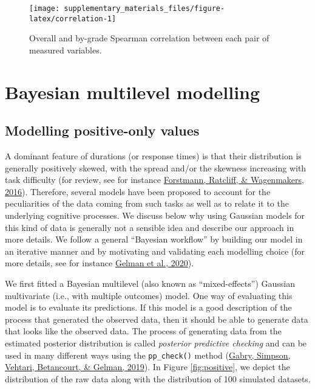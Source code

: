 \documentclass[
  11pt,
  english,
  ,doc,mask,floatsintext]{apa6}
\begin{document}
\begin{figure}[!htb]

{\centering \texttt{[image: supplementary\_materials\_files/figure-latex/correlation-1]} 

}

\caption{Overall and by-grade Spearman correlation between each pair of measured variables.}\label{fig:correlation}
\end{figure}

\newpage

\hypertarget{bayesian-multilevel-modelling}{%
\section{Bayesian multilevel modelling}\label{bayesian-multilevel-modelling}}

\hypertarget{modelling-positive-only-values}{%
\subsection{Modelling positive-only values}\label{modelling-positive-only-values}}

A dominant feature of durations (or response times) is that their distribution is generally positively skewed, with the spread and/or the skewness increasing with task difficulty (for review, see for instance \protect\hyperlink{ref-forstmann_sequential_2016}{Forstmann, Ratcliff, \& Wagenmakers, 2016}). Therefore, several models have been proposed to account for the peculiarities of the data coming from such tasks as well as to relate it to the underlying cognitive processes. We discuss below why using Gaussian models for this kind of data is generally not a sensible idea and describe our approach in more details. We follow a general ``Bayesian workflow'' by building our model in an iterative manner and by motivating and validating each modelling choice (for more details, see for instance \protect\hyperlink{ref-gelman_bayesian_2020}{Gelman et al., 2020}).

We first fitted a Bayesian multilevel (also known as ``mixed-effects'') Gaussian multivariate (i.e., with multiple outcomes) model. One way of evaluating this model is to evaluate its predictions. If this model is a good description of the process that generated the observed data, then it should be able to generate data that looks like the observed data. The process of generating data from the estimated posterior distribution is called \emph{posterior predictive checking} and can be used in many different ways using the \texttt{pp\_check()} method (\protect\hyperlink{ref-gabry_visualization_2019}{Gabry, Simpson, Vehtari, Betancourt, \& Gelman, 2019}). In Figure \ref{fig:positive}, we depict the distribution of the raw data along with the distribution of 100 simulated datasets.
\end{document}
